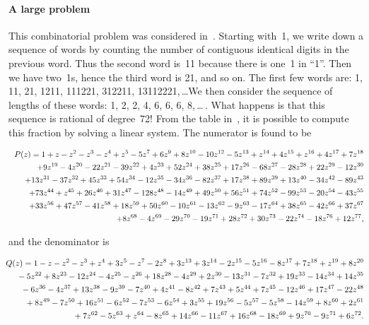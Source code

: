 \paragraph{A large problem} This combinatorial problem was considered
in~\cite{Conway87}.  Starting with~1, we write down a sequence of
words  by counting the  number  of contiguous identical digits  in the
previous word.  Thus the second word  is~11 because there  is one~1 in
``1''.   Then we have two~1s,  hence the third word  is 21, and so on.
The  first   few words are:   1,  11,    21,   1211,   111221, 312211,
13112221,\,\ldots  We then consider the  sequence  of lengths of these
words: 1, 2,  2, 4, 6, 6, 6,  8,\,\ldots\,.  What happens is that this
sequence   is   rational    of     degree~72!    From   the      table
in~\cite[pp.~177--178]{Conway87}, it is possible to compute this
fraction by solving a linear system. The numerator is found to be
\begin{small}
\begin{eqnarray*} 
&&\hskip-0.5cm P(z)=1 + z - z^2 - z^3 - z^4 + z^5 - 5z^7 + 6z^9
 + 8z^{10} - 10z^{12} - 5z^{13} + z^{14} + 4z^{15} + z^{16} + 
4z^{17} + 7z^{18} \\ 
&&\quad+ 9z^{19} - 4z^{20} - 22
z^{21} - 39z^{22} + 4z^{23} + 52z^{24} + 38z^{25} + 17z^{26}
 - 68z^{27} - 28z^{28} + 22z^{29} -12z^{30}\\ 
&&\quad
 + 13z^{31} - 37z^{32} + 45z^{33} + 54z^{34} - 12z^{35} - 34
z^{36} - 82z^{37} + 17z^{38} + 89z^{39}+13z^{40}-34z^{42} - 89z^{43} \\ 
&&\quad+ 73z^{44} + z^{45} + 26z^{46}
 + 31z^{47} - 128z^{48} - 14z^{49} + 49z^{50} + 56z^{51}
+ 74z^{52} - 99z^{53} - 20z^{54} - 43z^{55} \\ 
&&\quad + 33z^{56} + 47z^{57} - 41z^{58} + 18z^{59} + 50z^{60} - 10
z^{61} - 13z^{62} - 9z^{63} - 17z^{64} + 38
z^{65}- 42z^{66} + 37z^{67}\\ 
&&\quad  + 8z^{68} - 4z^{69} - 29z^{70
} - 19z^{71} + 28z^{72}+ 30z^{73} - 22z^{74
} - 18z^{76} + 12z^{77},
\end{eqnarray*}
\end{small}
and the denominator is
\begin{small}
\begin{eqnarray*}
\hskip-.5cm&& Q(z)=1 - z - z^2 - z^3 + z^4 + 3z^5 - z^7 - 2z^8
 + 3z^{13} + 3z^{14} - 2z^{15} - 5z^{16} - 8z^{17} + 7z^{
18} + z^{19} + 8z^{20}\\ 
\hskip-2cm&&\quad\mbox{}  - 5z^{22} + 8z^{23} - 
12z^{24} - 4z^{25} - z^{26} + 18z^{28} - 4z^{29} + 2z^{30}
 - 13z^{31} - 7z^{32} + 19z^{33} - 14z^{34}
 + 14z^{35}\\ 
\hskip-2cm&&\quad\mbox{}  - 6z^{36} - 4z^{37} + 13z^{38} -
9z^{39} - 7z^{40} + 4z^{41} - 8z^{42} + 7z^{43} + 5z^{44}
+ 7z^{45}- 12z^{46} + 17z^{47} - 22z^{48} 
 \\ 
\hskip-2cm&&\quad\mbox{} + 8z^{49}
 - 7z^{50} + 16z^{51} - 6z^{52} - 7z^{53} - 6z^{54} + 3z^{
55} + 19z^{56} - 5z^{57} - 5z^{58} - 14z^{59
} + 8z^{60}  + 2z^{61} \\ 
\hskip-2cm&&\quad\mbox{}  + 7z^{62} - 5z^{63} + z^{64}
- 8z^{65} + 14z^{66} - 11z^{67} + 16z^{68} - 18z^{69}
 + 9z^{70} - 9z^{71} + 6z^{72}.
\end{eqnarray*}
\end{small}
